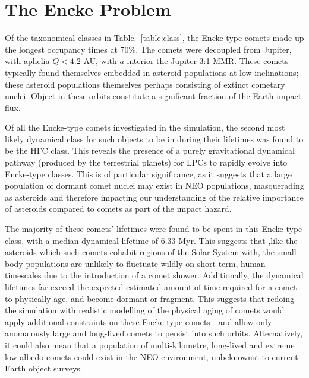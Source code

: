 \section{The Encke Problem}

Of the taxonomical classes in Table.~\ref{table:class}, the Encke-type comets made up the longest occupancy times at 70\%. The comets were decoupled from Jupiter, with aphelia $Q < 4.2$ AU, with $a$ interior the Jupiter 3:1 MMR. These comets typically found themselves embedded in asteroid populations at low inclinations; these asteroid populations themselves perhaps consisting of extinct cometary nuclei. Object in these orbits constitute a significant fraction of the Earth impact flux.

Of all the Encke-type comets investigated in the simulation, the second most likely dynamical class for such objects to be in during their lifetimes was found to be the HFC class. This reveals the presence of a purely gravitational dynamical pathway (produced by the terrestrial planets) for LPCs to rapidly evolve into Encke-type classes. This is of particular significance, as it suggests that a large population of dormant comet nuclei may exist in NEO populations, masquerading as asteroids and therefore impacting our understanding  of  the  relative  importance  of  asteroids  compared to comets as part of the impact hazard.

The majority of these comets' lifetimes were found to be spent in this Encke-type class, with a median dynamical lifetime of 6.33 Myr. This suggests that ,like the asteroids which such comets cohabit regions of the Solar System with, the small body populations are unlikely to fluctuate wildly on short-term, human timescales due to the introduction of a comet shower. Additionally, the dynamical lifetimes far exceed the expected estimated amount of time required for a comet to physically age, and become dormant or fragment. This suggests that redoing the simulation with realistic modelling of the physical aging of comets would apply additional constraints on these Encke-type comets -  and allow only anomalously large and long-lived comets to persist into such orbits. Alternatively, it could also mean that a population of multi-kilometre, long-lived and extreme low albedo comets could exist in the NEO environment, unbeknownst to current Earth object surveys.


